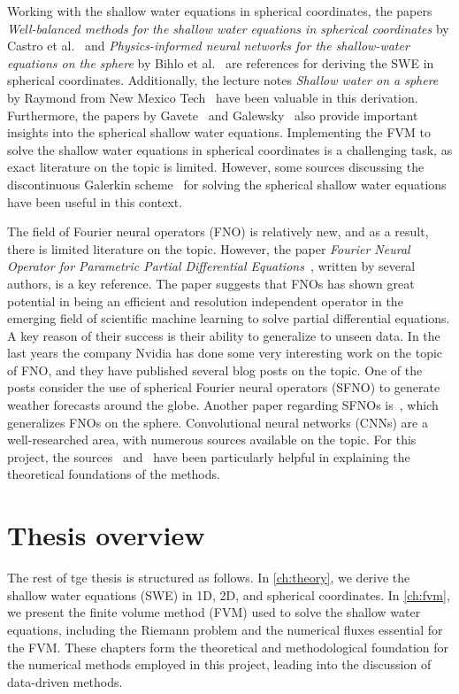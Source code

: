 Working with the shallow water equations in spherical coordinates, the papers \textit{Well-balanced methods for the shallow water equations in spherical coordinates} by Castro et al.~\cite{Castro2017} and \textit{Physics-informed neural networks for the shallow-water equations on the sphere} by Bihlo et al.~\cite{Bihlo2022} are references for deriving the SWE in spherical coordinates.
Additionally, the lecture notes \textit{Shallow water on a sphere} by Raymond from New Mexico Tech~\cite{Raymond} have been valuable in this derivation.
Furthermore, the papers by Gavete~\cite{Gavete_2009} and Galewsky~\cite{Galewsky_2004} also provide important insights into the spherical shallow water equations.
Implementing the FVM to solve the shallow water equations in spherical coordinates is a challenging task, as exact literature on the topic is limited.
However, some sources discussing the discontinuous Galerkin scheme~\cite{Hesthaven2008} for solving the spherical shallow water equations have been useful in this context.

The field of Fourier neural operators (FNO) is relatively new, and as a result, there is limited literature on the topic.
However, the paper \textit{Fourier Neural Operator for Parametric Partial Differential Equations}~\cite{FNO_2021}, written by several authors, is a key reference.
The paper suggests that FNOs has shown great potential in being an efficient and resolution independent operator in the emerging field of scientific machine learning to solve partial differential equations.
A key reason of their success is their ability to generalize to unseen data.
In the last years the company Nvidia has done some very interesting work on the topic of FNO, and they have published several blog posts on the topic.
One of the posts consider the use of spherical Fourier neural operators (SFNO) to generate weather forecasts around the globe\cite{Nvidia2023}.
Another paper regarding SFNOs is~\cite{bonev2023-SFNO}, which generalizes FNOs on the sphere.
Convolutional neural networks (CNNs) are a well-researched area, with numerous sources available on the topic.
For this project, the sources~\cite{oshea2015introductionconvolutionalneuralnetworks} and~\cite{chollet2017comprehensive} have been particularly helpful in explaining the theoretical foundations of the methods.

\section{Thesis overview}
The rest of tge thesis is structured as follows.
In \autoref{ch:theory}, we derive the shallow water equations (SWE) in 1D, 2D, and spherical coordinates.
In \autoref{ch:fvm}, we present the finite volume method (FVM) used to solve the shallow water equations, including the Riemann problem and the numerical fluxes essential for the FVM.
These chapters form the theoretical and methodological foundation for the numerical methods employed in this project, leading into the discussion of data-driven methods.

